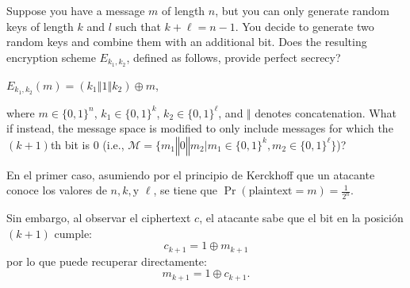 \documentclass[12pt,addpoints,answers]{exam}
\begin{document}
\begin{questions}


\question[10] Suppose you have a message $m$ of length $n$, but you can only generate random keys of length $k$ and $l$ such that $k + \ell = n - 1$. You decide to generate two random keys and combine them with an additional bit. Does the resulting encryption scheme $E_{k_1,k_2}$, defined as follows, provide perfect secrecy?
\begin{center}
      $E_{k_1,k_2}(m) = (k_1\mathbin\Vert 1 \mathbin\Vert k_2) \oplus m$,
\end{center}
where $m \in \{0,1\}^n$, $k_1 \in \{0,1\}^k$, $k_2 \in \{0,1\}^\ell$, and $\Vert$ denotes concatenation. What if instead, the message space is modified to only include messages for which the $(k+1)$th bit is $0$ (i.e., $\mathcal{M}=\big\{m_1\mathbin\Vert0\mathbin\Vert m_2\mathbin\big\vert m_1\in\{0,1\}^k,m_2\in\{0,1\}^\ell\big\}$)?
\begin{solution}
    En el primer caso, asumiendo por el principio de Kerckhoff que un atacante conoce los valores de $n, k, \text{y } \ell$, se tiene que $\Pr(\text{plaintext} = m) = \frac{1}{2^n}$.

    Sin embargo, al observar el ciphertext $c$, el atacante sabe que el bit en la posición $(k+1)$ cumple:
    \[
        c_{k+1} = 1 \oplus m_{k+1}
    \]
    por lo que puede recuperar directamente:
    \[
        m_{k+1} = 1 \oplus c_{k+1}.
    \]


\end{solution}
\end{questions}
\end{document}
